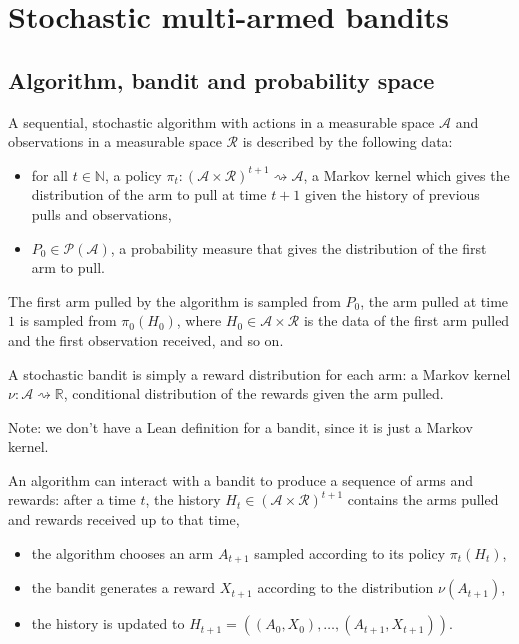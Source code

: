 \chapter{Stochastic multi-armed bandits}

\section{Algorithm, bandit and probability space}

\begin{definition}[Algorithm]\label{def:algorithm}
  \leanok
A sequential, stochastic algorithm with actions in a measurable space $\mathcal{A}$ and observations in a measurable space $\mathcal{R}$ is described by the following data:
\begin{itemize}
  \item for all $t \in \mathbb{N}$, a policy $\pi_t : (\mathcal{A} \times \mathcal{R})^{t+1} \rightsquigarrow \mathcal{A}$, a Markov kernel which gives the distribution of the arm to pull at time $t+1$ given the history of previous pulls and observations,
  \item $P_0 \in \mathcal{P}(\mathcal{A})$, a probability measure that gives the distribution of the first arm to pull.
\end{itemize}
\end{definition}


The first arm pulled by the algorithm is sampled from $P_0$, the arm pulled at time $1$ is sampled from $\pi_0(H_0)$, where $H_0 \in \mathcal{A} \times \mathcal{R}$ is the data of the first arm pulled and the first observation received, and so on.


\begin{definition}[Bandit]\label{def:bandit}
  \mathlibok
A stochastic bandit is simply a reward distribution for each arm: a Markov kernel $\nu : \mathcal{A} \rightsquigarrow \mathbb{R}$, conditional distribution of the rewards given the arm pulled.
\end{definition}


Note: we don't have a Lean definition for a bandit, since it is just a Markov kernel.

An algorithm can interact with a bandit to produce a sequence of arms and rewards: after a time $t$, the history $H_t \in (\mathcal{A} \times \mathcal{R})^{t+1}$ contains the arms pulled and rewards received up to that time,
\begin{itemize}
  \item the algorithm chooses an arm $A_{t+1}$ sampled according to its policy $\pi_t(H_t)$,
  \item the bandit generates a reward $X_{t+1}$ according to the distribution $\nu(A_{t+1})$,
  \item the history is updated to $H_{t+1} = ((A_0, X_0), \ldots, (A_{t+1}, X_{t+1}))$.
\end{itemize}


